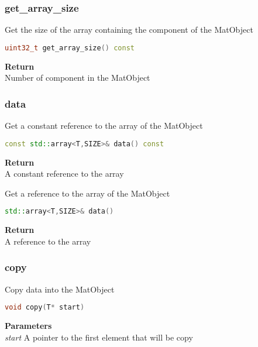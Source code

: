 \subsubsection{get\_array\_size}
\begin{mdframed}
Get the size of the array containing the component of the MatObject
\begin{lstlisting}[language=C++]
uint32_t get_array_size() const 
\end{lstlisting}
\textbf{Return} \\ 
Number of component in the MatObject\\ 
\end{mdframed}

\subsubsection{data}
\begin{mdframed}
Get a constant reference to the array of the MatObject
\begin{lstlisting}[language=C++]
const std::array<T,SIZE>& data() const 
\end{lstlisting}
\textbf{Return} \\ 
A constant reference to the array\\ 
\end{mdframed}

\begin{mdframed}
Get a reference to the array of the MatObject
\begin{lstlisting}[language=C++]
std::array<T,SIZE>& data() 
\end{lstlisting}
\textbf{Return} \\ 
A reference to the array\\ 
\end{mdframed}

\subsubsection{copy}
\begin{mdframed}
Copy data into the MatObject
\begin{lstlisting}[language=C++]
void copy(T* start)
\end{lstlisting}
\textbf{Parameters} \\ 
\textit{start} A pointer to the first element that will be copy \\ 
\end{mdframed}

